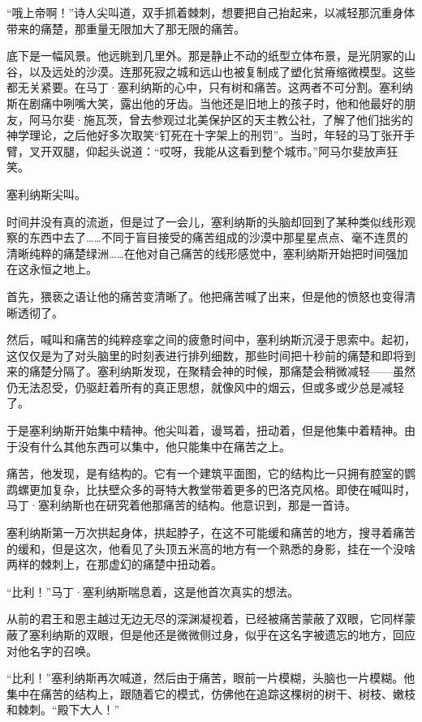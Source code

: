 \documentclass[AutoFakeBold=true]{book}
\begin{document}
``哦上帝啊！''诗人尖叫道，双手抓着棘刺，想要把自己抬起来，以减轻那沉重身体带来的痛楚，那重量无限加大了那无限的痛苦。

底下是一幅风景。他远眺到几里外。那是静止不动的纸型立体布景，是光阴冢的山谷，以及远处的沙漠。连那死寂之城和远山也被复制成了塑化贫瘠缩微模型。这些都无关紧要。在马丁·塞利纳斯的心中，只有树和痛苦。这两者不可分割。塞利纳斯在剧痛中咧嘴大笑，露出他的牙齿。当他还是旧地上的孩子时，他和他最好的朋友，阿马尔斐·施瓦茨，曾去参观过北美保护区的天主教公社，了解了他们拙劣的神学理论，之后他好多次取笑``钉死在十字架上的刑罚''。当时，年轻的马丁张开手臂，叉开双腿，仰起头说道：``哎呀，我能从这看到整个城市。''阿马尔斐放声狂笑。

塞利纳斯尖叫。

时间并没有真的流逝，但是过了一会儿，塞利纳斯的头脑却回到了某种类似线形观察的东西中去了……不同于盲目接受的痛苦组成的沙漠中那星星点点、毫不连贯的清晰纯粹的痛楚绿洲……在他对自己痛苦的线形感觉中，塞利纳斯开始把时间强加在这永恒之地上。

首先，猥亵之语让他的痛苦变清晰了。他把痛苦喊了出来，但是他的愤怒也变得清晰透彻了。

然后，喊叫和痛苦的纯粹痉挛之间的疲惫时间中，塞利纳斯沉浸于思索中。起初，这仅仅是为了对头脑里的时刻表进行排列细数，那些时间把十秒前的痛楚和即将到来的痛楚分隔了。塞利纳斯发现，在聚精会神的时候，那痛楚会稍微减轻——虽然仍无法忍受，仍驱赶着所有的真正思想，就像风中的烟云，但或多或少总是减轻了。

于是塞利纳斯开始集中精神。他尖叫着，谩骂着，扭动着，但是他集中着精神。由于没有什么其他东西可以集中，他只能集中在痛苦之上。

痛苦，他发现，是有结构的。它有一个建筑平面图，它的结构比一只拥有腔室的鹦鹉螺更加复杂，比扶壁众多的哥特大教堂带着更多的巴洛克风格。即使在喊叫时，马丁·塞利纳斯也在研究着他那痛苦的结构。他意识到，那是一首诗。

塞利纳斯第一万次拱起身体，拱起脖子，在这不可能缓和痛苦的地方，搜寻着痛苦的缓和，但是这次，他看见了头顶五米高的地方有一个熟悉的身影，挂在一个没啥两样的棘刺上，在那虚幻的痛楚中扭动着。

``比利！''马丁·塞利纳斯喘息着，这是他首次真实的想法。

从前的君王和恩主越过无边无尽的深渊凝视着，已经被痛苦蒙蔽了双眼，它同样蒙蔽了塞利纳斯的双眼，但是他还是微微侧过身，似乎在这名字被遗忘的地方，回应对他名字的召唤。

``比利！''塞利纳斯再次喊道，然后由于痛苦，眼前一片模糊，头脑也一片模糊。他集中在痛苦的结构上，跟随着它的模式，仿佛他在追踪这棵树的树干、树枝、嫩枝和棘刺。``殿下大人！''
\end{document}
